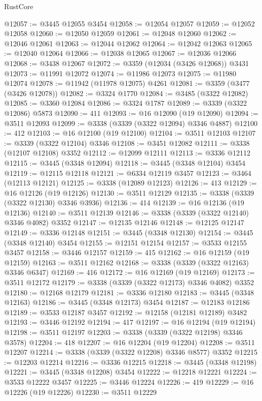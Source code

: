 \begin{lexlean}{RustCore}
\begin{coremodule}
@12057 := @3445 @12055 @3454
@12058 := @12054 @12057
@12059 := @12052 @12058
@12060 := @12050 @12059
@12061 := @12048 @12060
@12062 := @12046 @12061
@12063 := @12044 @12062
@12064 := @12042 @12063
@12065 := @12040 @12064
@12066 := @12038 @12065
@12067 := @12036 @12066
@12068 := @3438 @12067
@12072 := @3359 (@12034 (@3426 @12068)) @3431
@12073 := @11991 @12072
@12074 := @11986 @12073
@12075 := @11980 @12074
@12078 := @11942 (@11978 @12075) @4261
@12081 := @3359 (@3477 (@3426 @12078))
@12082 := @3324 @1770
@12084 := @3485 (@3322 @12082)
@12085 := @3360 @12084
@12086 := @3324 @1787
@12089 := @3339 (@3322 @12086) @5873
@12090 := 411
@12093 := @16 @12090 (@19 @12090)
@12094 := @3511 @12093
@12099 := @3338 (@3339 (@3322 @12094) @3346 @4887)
@12100 := 412
@12103 := @16 @12100 (@19 @12100)
@12104 := @3511 @12103
@12107 := @3339 (@3322 @12104) @3346
@12108 := @3451 @12082
@12111 := @3338 (@12107 @12108) @3352
@12112 := @12099 @12111
@12113 := @3336 @12112
@12115 := @3445 (@3348 @12094)
@12118 := @3445 (@3348 @12104) @3454
@12119 := @12115 @12118
@12121 := @6334 @12119 @3457
@12123 := @3464 (@12113 @12121)
@12125 := @3338 (@12089 @12123)
@12126 := 413
@12129 := @16 @12126 (@19 @12126)
@12130 := @3511 @12129
@12135 := @3338 (@3339 (@3322 @12130) @3346 @3936)
@12136 := 414
@12139 := @16 @12136 (@19 @12136)
@12140 := @3511 @12139
@12146 := @3338 (@3339 (@3322 @12140) @3346 @4082) @3352
@12147 := @12135 @12146
@12148 := @12125 @12147
@12149 := @3336 @12148
@12151 := @3445 (@3348 @12130)
@12154 := @3445 (@3348 @12140) @3454
@12155 := @12151 @12154
@12157 := @3533 @12155 @3457
@12158 := @3446 @12157
@12159 := 415
@12162 := @16 @12159 (@19 @12159)
@12163 := @3511 @12162
@12168 := @3338 (@3339 (@3322 @12163) @3346 @6347)
@12169 := 416
@12172 := @16 @12169 (@19 @12169)
@12173 := @3511 @12172
@12179 := @3338 (@3339 (@3322 @12173) @3346 @4082) @3352
@12180 := @12168 @12179
@12181 := @3336 @12180
@12183 := @3445 (@3348 @12163)
@12186 := @3445 (@3348 @12173) @3454
@12187 := @12183 @12186
@12189 := @3533 @12187 @3457
@12192 := @12158 (@12181 @12189) @3482
@12193 := @3446 @12192
@12194 := 417
@12197 := @16 @12194 (@19 @12194)
@12198 := @3511 @12197
@12203 := @3338 (@3339 (@3322 @12198) @3346 @3578)
@12204 := 418
@12207 := @16 @12204 (@19 @12204)
@12208 := @3511 @12207
@12214 := @3338 (@3339 (@3322 @12208) @3346 @8577) @3352
@12215 := @12203 @12214
@12216 := @3336 @12215
@12218 := @3445 (@3348 @12198)
@12221 := @3445 (@3348 @12208) @3454
@12222 := @12218 @12221
@12224 := @3533 @12222 @3457
@12225 := @3446 @12224
@12226 := 419
@12229 := @16 @12226 (@19 @12226)
@12230 := @3511 @12229

\end{coremodule}
\end{lexlean}
